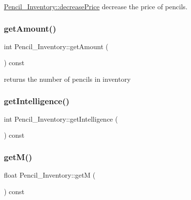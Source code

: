 \mbox{\hyperlink{classPencil__Inventory_a711d64e733cd5b67ea3aeb0ccdda0870}{Pencil\+\_\+\+Inventory\+::decrease\+Price}} decrease the price of pencils. 

\mbox{\label{classPencil__Inventory_a493a0967a8369d5b8c3e3709eeb21b5e}} 
\subsubsection{\texorpdfstring{getAmount()}{getAmount()}}
{\footnotesize\ttfamily int Pencil\+\_\+\+Inventory\+::get\+Amount (\begin{DoxyParamCaption}{ }\end{DoxyParamCaption}) const}



returns the number of pencils in inventory 

\mbox{\label{classPencil__Inventory_a7a46e70894e06409c312be8fc87628bb}} 
\subsubsection{\texorpdfstring{getIntelligence()}{getIntelligence()}}
{\footnotesize\ttfamily int Pencil\+\_\+\+Inventory\+::get\+Intelligence (\begin{DoxyParamCaption}{ }\end{DoxyParamCaption}) const}

\mbox{\label{classPencil__Inventory_afb3b97fbc0bcac1bdce65e088dc1e52f}} 
\subsubsection{\texorpdfstring{getM()}{getM()}}
{\footnotesize\ttfamily float Pencil\+\_\+\+Inventory\+::getM (\begin{DoxyParamCaption}{ }\end{DoxyParamCaption}) const}



